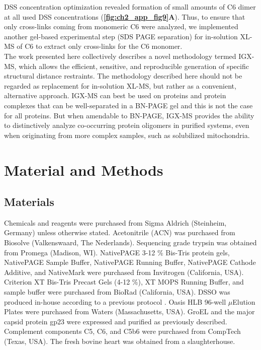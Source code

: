 DSS concentration optimization revealed formation of small amounts of C6 dimer at all used DSS concentrations (\textbf{\autoref{fig:ch2_app_fig9}A}). Thus, to ensure that only cross-links coming from monomeric C6 were analyzed, we implemented another gel-based experimental step (SDS PAGE separation) for in-solution XL-MS of C6 to extract only cross-links for the C6 monomer.\\
The work presented here collectively describes a novel methodology termed IGX-MS, which allows the efficient, sensitive, and reproducible generation of specific structural distance restraints. The methodology described here should not be regarded as replacement for in-solution XL-MS, but rather as a convenient, alternative approach. IGX-MS can best be used on proteins and protein complexes that can be well-separated in a BN-PAGE gel and this is not the case for all proteins. But when amendable to BN-PAGE, IGX-MS provides the ability to distinctively analyze co-occurring protein oligomers in purified systems, even when originating from more complex samples, such as solubilized mitochondria.

\section{Material and Methods}
\subsection*{Materials}
Chemicals and reagents were purchased from Sigma Aldrich (Steinheim, Germany) unless otherwise stated. Acetonitrile (ACN) was purchased from Biosolve (Valkenswaard, The Nederlands). Sequencing grade trypsin was obtained from Promega (Madison, WI). NativePAGE 3-12 \% Bis-Tris protein gels, NativePAGE Sample Buffer, NativePAGE Running Buffer, NativePAGE Cathode Additive, and NativeMark were purchased from Invitrogen (California, USA). Criterion XT Bis-Tris Precast Gels (4-12 \%), XT MOPS Running Buffer, and sample buffer were purchased from BioRad (California, USA). DSSO was produced in-house according to a previous protocol \cite{Kao_2011}. Oasis HLB 96-well $\mu$Elution Plates were purchased from Waters (Massachusetts, USA). GroEL and the major capsid protein gp23 were expressed and purified as previously described. \cite{Quaite-Randall_2000, van_Duijn_2005, van_Duijn_2006} Complement components C5, C6, and C5b6 were purchased from CompTech (Texas, USA). The fresh bovine heart was obtained from a slaughterhouse.

